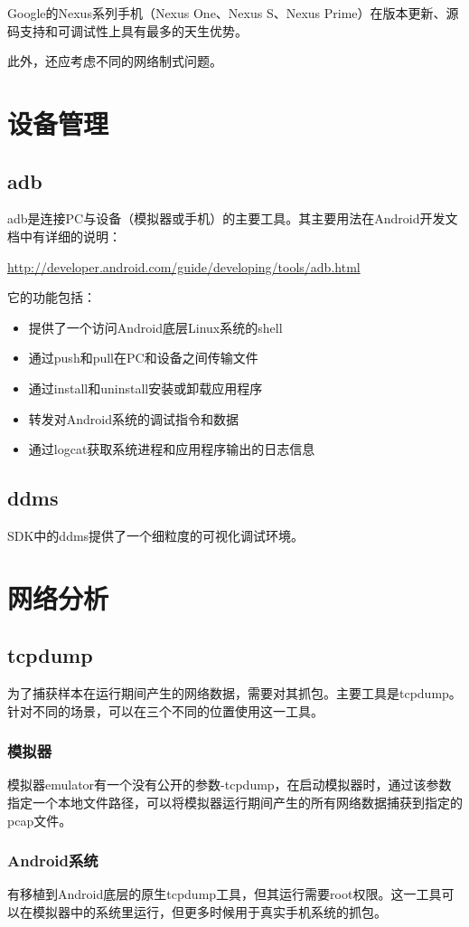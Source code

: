 Google的Nexus系列手机（Nexus One、Nexus S、Nexus Prime）在版本更新、源码支持和可调试性上具有最多的天生优势。

此外，还应考虑不同的网络制式问题。

\section{设备管理}
\subsection{adb}
adb是连接PC与设备（模拟器或手机）的主要工具。其主要用法在Android开发文档中有详细的说明：

\href{http://developer.android.com/guide/developing/tools/adb.html}{http://developer.android.com/guide/developing/tools/adb.html}

它的功能包括：
\begin{itemize}
\item 提供了一个访问Android底层Linux系统的shell
\item 通过push和pull在PC和设备之间传输文件
\item 通过install和uninstall安装或卸载应用程序
\item 转发对Android系统的调试指令和数据
\item 通过logcat获取系统进程和应用程序输出的日志信息
\end{itemize}

\subsection{ddms}
SDK中的ddms提供了一个细粒度的可视化调试环境。
\section{网络分析}
\subsection{tcpdump}
为了捕获样本在运行期间产生的网络数据，需要对其抓包。主要工具是tcpdump。针对不同的场景，可以在三个不同的位置使用这一工具。
\subsubsection{模拟器}
模拟器emulator有一个没有公开的参数-tcpdump，在启动模拟器时，通过该参数指定一个本地文件路径，可以将模拟器运行期间产生的所有网络数据捕获到指定的pcap文件。
\subsubsection{Android系统}
有移植到Android底层的原生tcpdump工具，但其运行需要root权限。这一工具可以在模拟器中的系统里运行，但更多时候用于真实手机系统的抓包。
